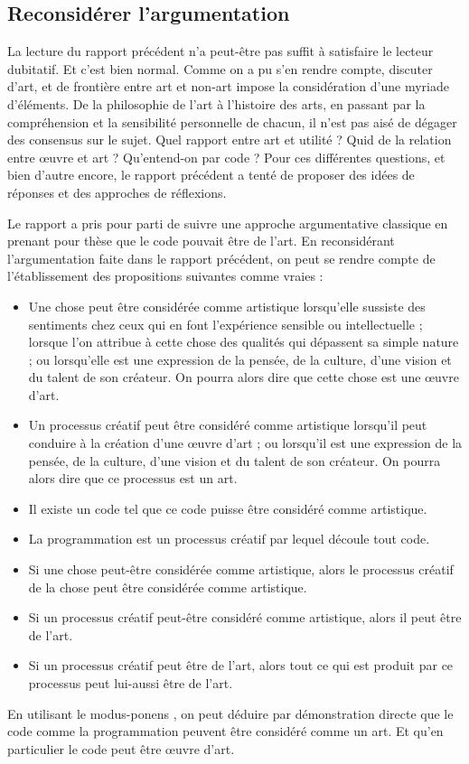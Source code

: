 \documentclass[12pt]{article} %
\begin{document}
\subsection{Reconsidérer l'argumentation}
La lecture du rapport précédent n'a peut-être pas suffit à satisfaire le lecteur dubitatif. Et c'est bien normal. Comme on a pu s'en rendre compte, discuter d'art, et de frontière entre art et non-art impose la considération d'une myriade d'éléments. De la philosophie de l'art à l'histoire des arts, en passant par la compréhension et la sensibilité personnelle de chacun, il n'est pas aisé de dégager des consensus sur le sujet. Quel rapport entre art et utilité ? Quid de la relation entre œuvre et art ? Qu'entend-on par code ? Pour ces différentes questions, et bien d'autre encore, le rapport précédent a tenté de proposer des idées de réponses et des approches de réflexions.

Le rapport a pris pour parti de suivre une approche argumentative classique en prenant pour thèse que le code pouvait être de l'art. En reconsidérant l'argumentation faite dans le rapport précédent, on peut se rendre compte de l'établissement des propositions suivantes comme vraies :
\begin{itemize}
    \item Une chose peut être considérée comme artistique lorsqu'elle sussiste des sentiments chez ceux qui en font l'expérience sensible ou intellectuelle ; lorsque l'on attribue à cette chose des qualités qui dépassent sa simple nature ; ou lorsqu'elle est une expression de la pensée, de la culture, d'une vision et du talent de son créateur. On pourra alors dire que cette chose est une œuvre d'art.
    \item Un processus créatif peut être considéré comme artistique lorsqu'il peut conduire à la création d'une œuvre d'art ; ou lorsqu'il est une expression de la pensée, de la culture, d'une vision et du talent de son créateur. On pourra alors dire que ce processus est un art.
    \item Il existe un code tel que ce code puisse être considéré comme artistique. 
    \item La programmation est un processus créatif par lequel découle tout code.
    \item Si une chose peut-être considérée comme artistique, alors le processus créatif de la chose peut être considérée comme artistique.
    \item Si un processus créatif peut-être considéré comme artistique, alors il peut être de l'art.
    \item Si un processus créatif peut être de l'art, alors tout ce qui est produit par ce processus peut lui-aussi être de l'art.
\end{itemize}
En utilisant le \gls{modus-ponens} \cite{SCalabretto-ALIA}, on peut déduire par démonstration directe que le code comme la programmation peuvent être considéré comme un art. Et qu'en particulier le code peut être œuvre d'art. 
\end{document}

